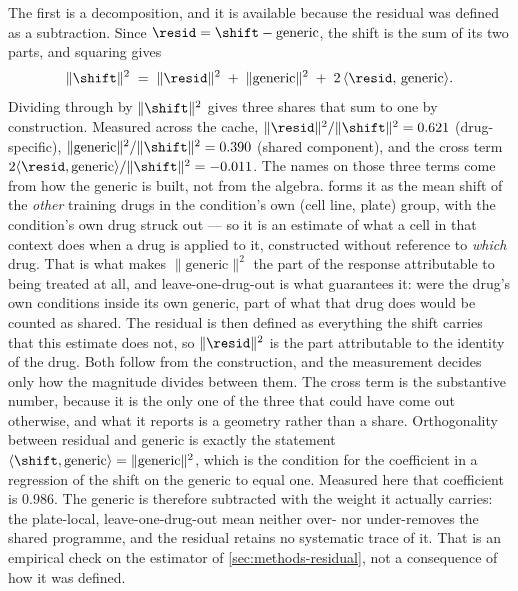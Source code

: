 The first is a decomposition, and it is available because the residual was defined
as a subtraction.  Since $\resid = \shift - \textrm{generic}$, the shift is the sum
of its two parts, and squaring gives
\begin{equation}
 \lVert \shift \rVert^{2}
 \;=\; \lVert \resid \rVert^{2}
 \;+\; \lVert \textrm{generic} \rVert^{2}
 \;+\; 2\,\langle \resid,\, \textrm{generic} \rangle .
\end{equation}
Dividing through by $\lVert \shift \rVert^{2}$ gives three shares that sum to one
by construction. Measured across the cache,
$\lVert \resid \rVert^{2} / \lVert \shift \rVert^{2} = 0.621$ (drug-specific),
$\lVert \textrm{generic} \rVert^{2} / \lVert \shift \rVert^{2} = 0.390$ (shared component), and the
cross term $2\langle \resid, \textrm{generic}\rangle / \lVert \shift \rVert^{2}
= -0.011$. The names on those three terms come from how the generic is built, not from the
algebra.  forms it as the mean shift of the \emph{other}
training drugs in the condition's own (cell line, plate) group, with the
condition's own drug struck out --- so it is an estimate of what a cell in that
context does when a drug is applied to it, constructed without reference to
\emph{which} drug. That is what makes $\lVert \textrm{generic} \rVert^{2}$ the part
of the response attributable to being treated at all, and leave-one-drug-out is
what guarantees it: were the drug's own conditions inside its own generic, part of
what that drug does would be counted as shared. The residual is then defined as
everything the shift carries that this estimate does not, so
$\lVert \resid \rVert^{2}$ is the part attributable to the identity of the drug. Both follow from the construction, and the measurement
decides only how the magnitude divides between them. 
The cross term is the substantive number, because it is the only one of the three
that could have come out otherwise, and what it reports is a geometry rather than
a share. Orthogonality between residual and generic is exactly the statement
$\langle \shift, \textrm{generic}\rangle = \lVert \textrm{generic} \rVert^{2}$,
which is the condition for the coefficient in a regression of the shift on the
generic to equal one. Measured here that coefficient is $0.986$. The generic is
therefore subtracted with the weight it actually carries: the plate-local,
leave-one-drug-out mean neither over- nor under-removes the shared programme, and
the residual retains no systematic trace of it. That is an empirical check on the
estimator of \cref{sec:methods-residual}, not a consequence of how it was defined.

